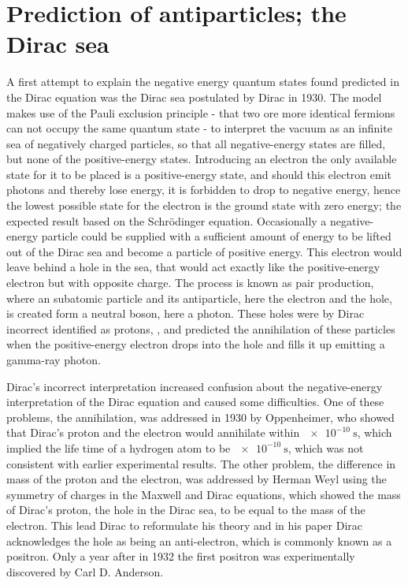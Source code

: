 \chapter{Prediction of antiparticles; the Dirac sea}
A first attempt to explain the negative energy quantum states found predicted in the Dirac equation was the Dirac sea postulated by Dirac in 1930. The model makes use of the Pauli exclusion principle - that two ore more identical fermions can not occupy the same quantum state - to interpret the vacuum as an infinite sea of negatively charged particles, so that all negative-energy states are filled, but none of the positive-energy states.\cite{bian_deduction_2016} Introducing an electron the only available state for it to be placed is a positive-energy state, and should this electron emit photons and thereby lose energy, it is forbidden to drop to negative energy, hence the lowest possible state for the electron is the ground state with zero energy; the expected result based on the Schrödinger equation. Occasionally a negative-energy particle could be supplied with a sufficient amount of energy to be lifted out of the Dirac sea and become a particle of positive energy. This electron would leave behind a hole in the sea, that would act exactly like the positive-energy electron but with opposite charge. The process is known as pair production, where an subatomic particle and its antiparticle, here the electron and the hole, is created form a neutral boson, here a photon. These holes were by Dirac incorrect identified as protons, \cite[p.~363]{dirac_theory_1930}, and predicted the annihilation of these particles when the positive-energy electron drops into the hole and fills it up emitting a gamma-ray photon.

Dirac's incorrect interpretation increased confusion about the negative-energy interpretation of the Dirac equation and caused some difficulties. One of these problems, the annihilation, was addressed in 1930 by Oppenheimer, who showed that Dirac's proton and the electron would annihilate within $\SI{e-10}{\second}$, which implied the life time of a hydrogen atom to be $\SI{e-10}{\second}$, which was not consistent with earlier experimental results. The other problem, the difference in mass of the proton and the electron, was addressed by Herman Weyl using the symmetry of charges in the Maxwell and Dirac equations, which showed the mass of Dirac's proton, the hole in the Dirac sea, to be equal to the mass of the electron.\cite[sec.~8]{rajasekaran_discovery_2003} This lead Dirac to reformulate his theory and in his paper \cite[p.~61]{dirac_quantised_1931} Dirac acknowledges the hole as being an anti-electron, which is commonly known as a positron. Only a year after in 1932 the first positron was experimentally discovered by Carl D. Anderson\cite{anderson_positive_1933}.


